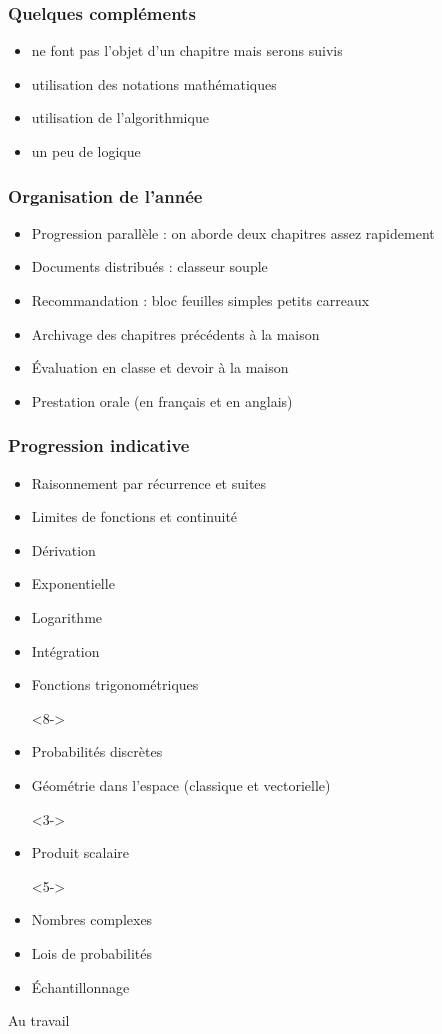\documentclass[frenchb]{beamer}
\begin{document}
\begin{frame}
  \frametitle{Quelques compléments}
  \begin{itemize}[<+->]
    \item ne font pas l'objet d'un chapitre mais serons suivis
    \item utilisation des notations mathématiques
    \item utilisation de l'algorithmique
    \item un peu de \alert{logique}
  \end{itemize}
\end{frame}

\begin{frame}
  \frametitle{Organisation de l'année}
  \begin{itemize}[<+->]
    \item Progression parallèle : on aborde deux chapitres assez
      rapidement
    \item Documents distribués : classeur souple
    \item Recommandation : bloc feuilles simples petits carreaux
    \item Archivage des chapitres précédents à la maison
    \item Évaluation en classe et devoir à la maison
    \item Prestation orale (en français et en anglais)
  \end{itemize}
\end{frame}

\begin{frame}
  \frametitle{Progression indicative}
  \begin{multicols}{2}
  \begin{itemize}
    \item<1-> Raisonnement par récurrence et suites
    \item<2-> Limites de fonctions et continuité
    \item<3-> Dérivation
    \item<4-> Exponentielle
    \item<5-> Logarithme
    \item<6-> Intégration
    \item<7-> Fonctions trigonométriques
    \item[]<8-> ~
      \columnbreak
    \item<1-> Probabilités discrètes
    \item<2-> Géométrie dans l'espace (classique et vectorielle)
    \item[]<3-> ~
    \item<4-> Produit scalaire
    \item[]<5-> ~
    \item<6-> Nombres complexes
    \item<7-> Lois de probabilités
    \item<8-> Échantillonnage
  \end{itemize}
\end{multicols}
\end{frame}

\begin{frame}
  \begin{center}
    \Large Au travail \normalsize
  \end{center}
\end{frame}
\end{document}
